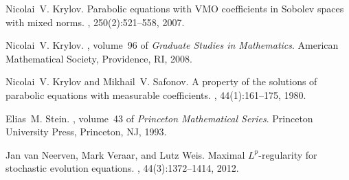 \documentclass[reqno]{amsart}
\numberwithin{equation}{section}
\theoremstyle{plain}
\theoremstyle{definition}
\theoremstyle{remark}
\begin{document}
\begin{thebibliography}{10}
Nicolai~V. Krylov.
\newblock Parabolic equations with {VMO} coefficients in {S}obolev spaces with
  mixed norms.
, 250(2):521--558, 2007.

Nicolai~V. Krylov.
, volume~96 of {\em Graduate Studies in Mathematics}.
\newblock American Mathematical Society, Providence, RI, 2008.

Nicolai~V. Krylov and Mikhail~V. Safonov.
\newblock A property of the solutions of parabolic equations with measurable
  coefficients.
, 44(1):161--175, 1980.

Elias~M. Stein.
, volume~43 of {\em Princeton Mathematical Series}.
\newblock Princeton University Press, Princeton, NJ, 1993.

Jan van Neerven, Mark Veraar, and Lutz Weis.
\newblock Maximal ${L}^p$-regularity for stochastic evolution equations.
, 44(3):1372--1414, 2012.

\end{thebibliography}
\end{document}
